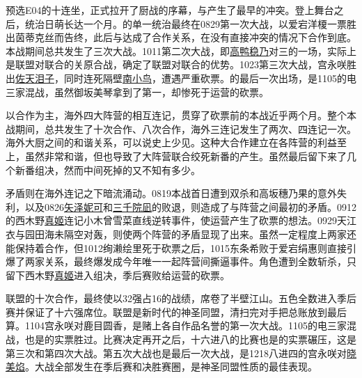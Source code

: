 预选E04的十连坐，正式拉开了厨战的序幕，与产生了最早的冲突。登上舞台之后，统治日萌长达一个月。的单一统治最终在0829第一次大战，以爱宕洋榎一票胜出茵蒂克丝而告终，此后与达成了合作关系，在没有直接冲突的情况下合作到底。本战期间总共发生了三次大战。1011第二次大战，即\uline{高鸭稳乃}对三的一场，实际上是联盟对联合的关原合战，确定了联盟对联合的优势。1023第三次大战，宫永咲胜出\uline{佐天泪子}，同时连死隔壁\uline{南小鸟}，遭遇严重砍票。的最后一次出场，是1105的电三家混战，虽然御坂美琴拿到了第一，却惨死于运营的砍票。

以合作为主，海外四大阵营的相互连记，贯穿了砍票前的本战近乎两个月。整个本战期间，总共发生了十次合作、八次合作，海外三连记发生了两次、四连记一次。海外大厨之间的和谐关系，可以说史上少见。这种大合作建立在各阵营的利益至上，虽然非常和谐，但也导致了大阵营联合绞死新番的产生。虽然最后留下来了几个新番组决，然而中间死掉的又不知有多少。

矛盾则在海外连记之下暗流涌动。0819本战首日遭到双杀和高坂穗乃果的意外失利，以及0826\uline{矢泽妮可}和\uline{三千院凪}的败退，则造成了与阵营之间最初的矛盾。0912的西木野\uline{真姬}连记小木曾雪菜直线逆转事件，使运营产生了砍票的想法。0929天江衣与园田海未隔空对轰，则使两个阵营的矛盾显现了出来。虽然一定程度上两家还能保持着合作，但1012绚濑绘里死于砍票之后，1015东条希败于爱宕绢惠则直接引爆了两家关系，最终爆发成今年唯一一起阵营间撕逼事件。角色遭到全数斩杀，只留下西木野\uline{真姬}进入组决，季后赛败给运营的砍票。

联盟的十次合作，最终使以32强占16的战绩，席卷了半壁江山。五色全数进入季后赛并保证了十六强席位。联盟是新时代的神圣同盟，清扫完对手把总账放到最后算。1104宫永咲对鹿目圆香，是赌上各自作品名誉的第一次大战。1105的电三家混战，也是的实票胜过。比赛决定再开之后，十六进八的比赛也是的实票碾压，这是第三次和第四次大战。第五次大战也是最后一次大战，是1218八进四的宫永咲对\uline{晓美焰}。大战全部发生在季后赛和决胜赛圈，是神圣同盟性质的最佳表现。

